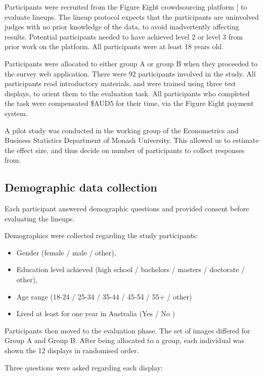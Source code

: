 \documentclass[
]{article}
\providecommand{\tightlist}{%
  \setlength{\itemsep}{0pt}\setlength{\parskip}{0pt}}
\begin{document}
Participants were recruited from the Figure Eight crowdsourcing platform
{[}\citeproc{ref-figeight}{22}{]} to evaluate lineups. The lineup
protocol expects that the participants are uninvolved judges with no
prior knowledge of the data, to avoid inadvertently affecting results.
Potential participants needed to have achieved level 2 or level 3 from
prior work on the platform. All participants were at least 18 years old.

Participants were allocated to either group A or group B when they
proceeded to the survey web application. There were 92 participants
involved in the study. All participants read introductory materials, and
were trained using three test displays, to orient them to the evaluation
task. All participants who completed the task were compensated \$AUD5
for their time, via the Figure Eight payment system.

A pilot study was conducted in the working group of the Econometrics and
Business Statistics Department of Monash University. This allowed us to
estimate the effect size, and thus decide on number of participants to
collect responses from.

\subsection{Demographic data
collection}\label{demographic-data-collection}

Each participant answered demographic questions and provided consent
before evaluating the lineups.

Demographics were collected regarding the study participants:

\begin{itemize}
\tightlist
\item
  Gender (female / male / other),
\item
  Education level achieved (high school / bachelors / masters /
  doctorate / other),
\item
  Age range (18-24 / 25-34 / 35-44 / 45-54 / 55+ / other)
\item
  Lived at least for one year in Australia (Yes / No )
\end{itemize}

Participants then moved to the evaluation phase. The set of images
differed for Group A and Group B. After being allocated to a group, each
individual was shown the 12 displays in randomised order.

Three questions were asked regarding each display:
\end{document}
